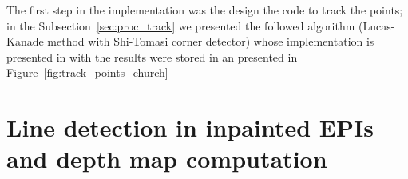 \bigskip

The first step in the implementation was the design the code to track the points; in the Subsection~\ref{sec:proc_track} we presented the followed algorithm (Lucas-Kanade method with Shi-Tomasi corner detector) whose implementation is presented in with the results were stored in an 
 presented in Figure~\ref{fig:track_points_church}-

\section{Line detection in inpainted EPIs and depth map computation}

